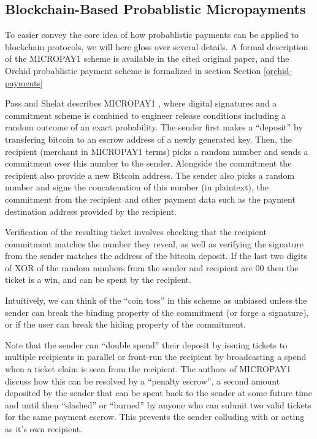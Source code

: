 \subsection{Blockchain-Based Probablistic Micropayments}

To easier convey the core idea of how probablistic payments can be applied to blockchain protocols, we will here gloss over several details. A formal description of the MICROPAY1 scheme is available in the cited original paper, and the Orchid probablistic payment scheme is formalized in section Section \ref{orchid-payments}

Pass and Shelat describes MICROPAY1 \cite{MICROPAY1}, where digital signatures and a commitment scheme is combined to engineer release conditions including a random outcome of an exact probability. The sender first makes a ``deposit'' by transfering bitcoin to an escrow address of a newly generated key. Then, the recipient (merchant in MICROPAY1 terms) picks a random number and sends a commitment over this number to the sender. Alongside the commitment the recipient also provide a new Bitcoin address. The sender also picks a random number and signs the concatenation of this number (in plaintext), the commitment from the recipient and other payment data such as the payment destination address provided by the recipient.

Verification of the resulting ticket involves checking that the recipient commitment matches the number they reveal, as well as verifying the signature from the sender matches the address of the bitcoin deposit. If the last two digits of XOR of the random numbers from the sender and recipient are 00 then the ticket is a win, and can be spent by the recipient.

Intuitively, we can think of the ``coin toss'' in this scheme as unbiased unless the sender can break the binding property of the commitment (or forge a signature), or if the user can break the hiding property of the commitment.

Note that the sender can ``double spend'' their deposit by issuing tickets to multiple recipients in parallel or front-run the recipient by broadcasting a spend when a ticket claim is seen from the recipient. The authors of MICROPAY1 discuss how this can be resolved by a ``penalty escrow'', a second amount deposited by the sender that can be spent back to the sender at some future time and until then  ``slashed'' or ``burned'' by anyone who can submit two valid tickets for the same payment escrow. This prevents the sender colluding with or acting as it's own recipient.

